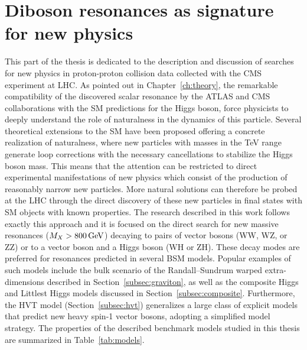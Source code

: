 \chapter{Diboson resonances as signature for new physics}
\label{ch:dibosonIntro}

This part of the thesis is dedicated to the description and discussion of searches for new physics in proton-proton collision data collected with the CMS experiment at LHC.
As pointed out in Chapter~\ref{ch:theory}, the remarkable compatibility of the discovered scalar resonance by the ATLAS and CMS collaborations with the SM predictions for the Higgs boson,
force physicists to deeply understand the role of naturalness in the dynamics of this particle.
Several theoretical extensions to the SM have been proposed offering a concrete realization of naturalness,
where new particles with masses in the TeV range generate loop corrections with the necessary cancellations to stabilize the Higgs boson mass.
This means that the attention can be restricted to direct experimental manifestations of new physics which consist of the production of reasonably narrow new particles.
More natural solutions can therefore be probed at the LHC through the direct discovery of these new particles in final states with SM objects with known properties.
The research described in this work follows exactly this approach and it is focused on the direct search for new massive resonances ($M_X > 800\,\text{Ge\hspace{-.08em}V}$) decaying to
pairs of vector bosons (WW, WZ, or ZZ)
or to a vector boson and a Higgs boson (WH or ZH).
These decay modes are preferred for resonances predicted in several BSM models. 
Popular examples of such models include the bulk scenario of the Randall--Sundrum warped extra-dimensions described in Section~\ref{subsec:graviton},
as well as the composite Higgs and Littlest Higgs models discussed in Section~\ref{subsec:composite}.
Furthermore, the HVT model (Section~\ref{subsec:hvt}) generalizes a large class of explicit models that predict new heavy spin-1 vector bosons,
adopting a simplified model strategy.
The properties of the described benchmark models studied in this thesis are summarized in Table~\ref{tab:models}.

